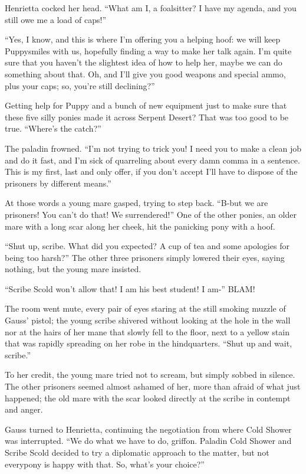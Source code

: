 Henrietta cocked her head. ``What am I, a foalsitter? I have my agenda, and you still owe me a load of caps!''

``Yes, I know, and this is where I'm offering you a helping hoof: we will keep Puppysmiles with us, hopefully finding a way to make her talk again. I'm quite sure that you haven't the slightest idea of how to help her, maybe we can do something about that. Oh, and I'll give you good weapons and special ammo, plus your caps; so, you're still declining?''

Getting help for Puppy and a bunch of new equipment just to make sure that these five silly ponies made it across Serpent Desert? That was too good to be true. ``Where's the catch?''

The paladin frowned. ``I'm not trying to trick you! I need you to make a clean job and do it fast, and I'm sick of quarreling about every damn comma in a sentence. This is my first, last and only offer, if you don't accept I'll have to dispose of the prisoners by different means.''

At those words a young mare gasped, trying to step back. ``B-but we are prisoners! You can't do that! We surrendered!'' One of the other ponies, an older mare with a long scar along her cheek, hit the panicking pony with a hoof.

``Shut up, scribe. What did you expected? A cup of tea and some apologies for being too harsh?'' The other three prisoners simply lowered their eyes, saying nothing, but the young mare insisted.

``Scribe Scold won't allow that! I am his best student! I am-'' BLAM!

The room went mute, every pair of eyes staring at the still smoking muzzle of Gauss' pistol; the young scribe shivered without looking at the hole in the wall nor at the hairs of her mane that slowly fell to the floor, next to a yellow stain that was rapidly spreading on her robe in the hindquarters. ``Shut up and wait, scribe.''

To her credit, the young mare tried not to scream, but simply sobbed in silence. The other prisoners seemed almost ashamed of her, more than afraid of what just happened; the old mare with the scar looked directly at the scribe in contempt and anger.

Gauss turned to Henrietta, continuing the negotiation from where Cold Shower was interrupted. ``We do what we have to do, griffon. Paladin Cold Shower and Scribe Scold decided to try a diplomatic approach to the matter, but not everypony is happy with that. So, what's your choice?''

